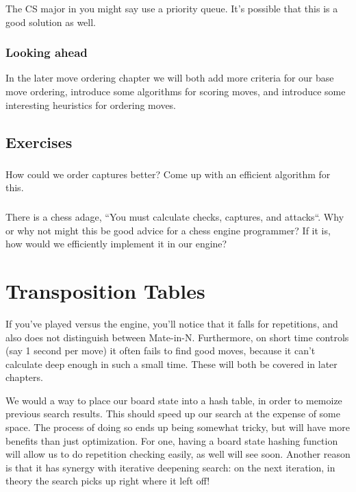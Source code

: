 \documentclass[letterpaper,11pt]{article}
\begin{document}
The CS major in you might say use a priority queue. It's possible that this is a good
solution as well.

\subsubsection*{Looking ahead}

In the later move ordering chapter we will both add more criteria for our base move ordering, 
introduce some algorithms for scoring moves, and introduce some interesting heuristics for 
ordering moves.

\subsection{Exercises}

\subsubsection{}

How could we order captures better? Come up with an efficient algorithm for this.

\subsubsection{}

There is a chess adage, ``You must calculate checks, captures, and attacks``. 
Why or why not might this be good advice for a chess engine programmer? If it is, how would 
we efficiently implement it in our engine?

\section{Transposition Tables}

If you've played versus the engine, you'll notice that 
it falls for repetitions, and also does not distinguish 
between Mate-in-N. Furthermore, on short time controls 
(say 1 second per move) it often fails to find good moves, because it can't calculate deep enough in such a small time. These will both be covered in later chapters.

We would a way to place our board state into a hash table, in order to memoize previous search results. This should speed up our search at the expense of some space.
The process of doing so ends up being somewhat tricky, but will have more benefits than just optimization. For one, having a board state hashing function 
will allow us to do repetition checking easily, as well will see soon. Another reason is that it has synergy with iterative deepening search: on the next iteration, in theory the search picks up right where it left off!
\end{document}
